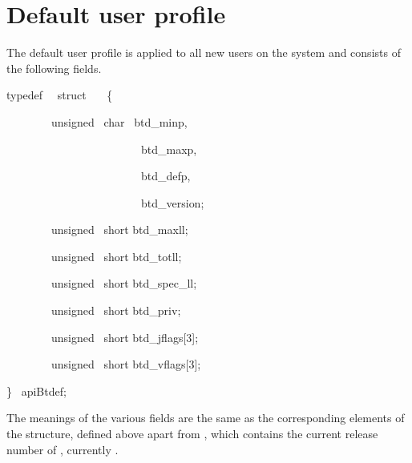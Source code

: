 \chapter{Default user profile}
\label{chp:default-user-profile}
\label{bkm:Defaultuser}The default user profile is applied to all new users on the system and consists of the following fields.

\begin{expara}

typedef \ \ struct \ \ \ \{

\ \ \ \ \ \ \ \ unsigned \ char \ btd\_minp,

\ \ \ \ \ \ \ \ \ \ \ \ \ \ \ \ \ \ \ \ \ \ \ \ btd\_maxp,

\ \ \ \ \ \ \ \ \ \ \ \ \ \ \ \ \ \ \ \ \ \ \ \ btd\_defp,

\ \ \ \ \ \ \ \ \ \ \ \ \ \ \ \ \ \ \ \ \ \ \ \ btd\_version;

\ \ \ \ \ \ \ \ unsigned \ short btd\_maxll;

\ \ \ \ \ \ \ \ unsigned \ short btd\_totll;

\ \ \ \ \ \ \ \ unsigned \ short btd\_spec\_ll;

\ \ \ \ \ \ \ \ unsigned \ short btd\_priv;

\ \ \ \ \ \ \ \ unsigned \ short btd\_jflags[3];

\ \ \ \ \ \ \ \ unsigned \ short btd\_vflags[3];

\} \ apiBtdef;

\end{expara}

The meanings of the various fields are the same as the corresponding elements of the  structure, defined above
apart from , which contains the current release number of \ProductName{}, currently .

